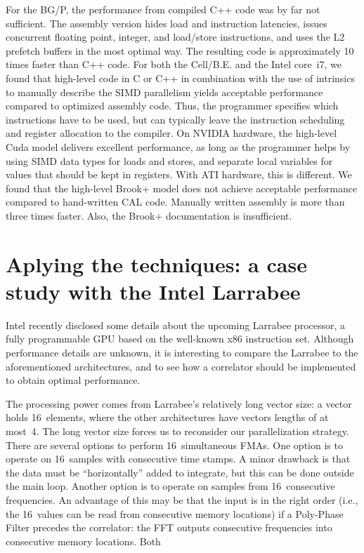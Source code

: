 \documentclass{article}
\begin{document}
For the BG/P, the performance from compiled C++ code was by far not
sufficient.  The assembly version hides load and instruction
latencies, issues concurrent floating point, integer, and load/store
instructions, and uses the L2 prefetch buffers in the most optimal
way.  The resulting code is approximately 10 times faster than C++
code.  For both the Cell/B.E. and the Intel core~i7, we found that
high-level code in C or C++ in combination with the use of intrinsics
to manually describe the SIMD parallelism yields acceptable
performance compared to optimized assembly code.  Thus, the programmer
specifies which instructions have to be used, but can typically leave
the instruction scheduling and register allocation to the compiler.
On NVIDIA hardware, the high-level Cuda model delivers excellent
performance, as long as the programmer helps by using SIMD data types
for loads and stores, and separate local variables for values that
should be kept in registers. With ATI hardware, this is different.  We
found that the high-level Brook+ model does not achieve acceptable
performance compared to hand-written CAL code.  Manually written assembly 
is more than three times faster. Also, the Brook+ documentation is insufficient.

\section{Aplying the techniques: a case study with the Intel Larrabee}

Intel recently disclosed some details about the upcoming Larrabee processor,
a fully programmable GPU based on the well-known x86 instruction set.
Although performance details are unknown, it is interesting to compare the
Larrabee to the aforementioned architectures, and to see how a correlator
should be implemented to obtain optimal performance.

The processing power comes from Larrabee's relatively long vector size:
a vector holds 16~elements, where the other architectures have vectors lengths
of at most~4.
The long vector size forces us to reconsider our parallelization strategy.
There are several options to perform 16~simultaneous FMAs.
One option is to operate on 16~samples with consecutive time stamps.
A minor drawback is that the data must be ``horizontally'' added to integrate,
but this can be done outside the main loop.
Another option is to operate on samples from 16~consecutive frequencies.
An advantage of this may be that the input is in the right order (i.e.,
the 16~values can be read from consecutive memory locations) if a Poly-Phase
Filter precedes the correlator: the FFT outputs consecutive frequencies into
consecutive memory locations.
Both 
\end{document}
